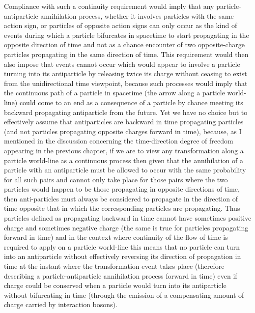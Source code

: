 \documentclass[notitlepage,12pt]{report}
\begin{document}
Compliance with such a continuity requirement would imply that any particle-antiparticle annihilation process, whether it involves particles with the same action sign, or particles of opposite action signs can only occur as the kind of events during which a particle bifurcates in spacetime to start propagating in the opposite direction of time and not as a chance encounter of two opposite-charge particles propagating in the same direction of time. This requirement would then also impose that events cannot occur which would appear to involve a particle turning into its antiparticle by releasing twice its charge without ceasing to exist from the unidirectional time viewpoint, because such processes would imply that the continuous path of a particle in spacetime (the arrow along a particle world-line) could come to an end as a consequence of a particle by chance meeting its backward propagating antiparticle from the future. Yet we have no choice but to effectively assume that antiparticles are backward in time propagating particles (and not particles propagating opposite charges forward in time), because, as I mentioned in the discussion concerning the time-direction degree of freedom appearing in the previous chapter, if we are to view any transformation along a particle world-line as a continuous process then given that the annihilation of a particle with an antiparticle must be allowed to occur with the same probability for all such pairs and cannot only take place for those pairs where the two particles would happen to be those propagating in opposite directions of time, then anti-particles must always be considered to propagate in the direction of time opposite that in which the corresponding particles are propagating. Thus particles defined as propagating backward in time cannot have sometimes positive charge and sometimes negative charge (the same is true for particles propagating forward in time) and in the context where continuity of the flow of time is required to apply on a particle world-line this means that no particle can turn into an antiparticle without effectively reversing its direction of propagation in time at the instant where the transformation event takes place (therefore describing a particle-antiparticle annihilation process forward in time) even if charge could be conserved when a particle would turn into its antiparticle without bifurcating in time (through the emission of a compensating amount of charge carried by interaction bosons).
\end{document}

